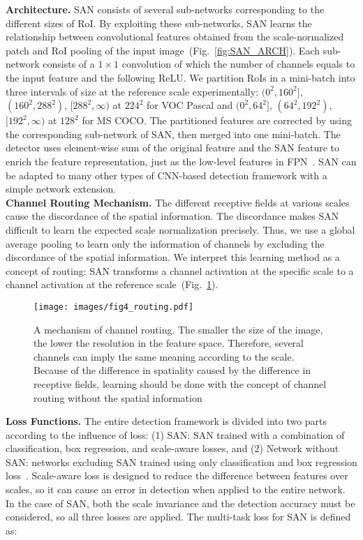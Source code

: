 \documentclass[runningheads]{llncs}
\begin{document}
\noindent
\textbf{Architecture.}
SAN consists of several sub-networks corresponding to the different sizes of RoI.
By exploiting these sub-networks, SAN learns the relationship between convolutional features obtained from the scale-normalized patch and RoI pooling of the input image~(Fig.~\ref{fig:SAN_ARCH}).
Each sub-network consists of a $1\times1$ convolution of which the number of channels equals to the input feature and the following ReLU. 
We partition RoIs in a mini-batch into three intervals of size at the reference scale experimentally: 
$(0^2,160^2]$, $(160^2,288^2)$, $[288^2,\infty)$ at $224^2$ for VOC Pascal 
and
$(0^2,64^2]$, $(64^2,192^2)$, $[192^2,\infty)$ at $128^2$ for MS COCO. 
The partitioned features are corrected by using the corresponding sub-network of SAN, then merged into one mini-batch.
The detector uses element-wise sum of the original feature and the SAN feature to enrich the feature representation, just as the low-level features in FPN~\cite{lin2017feature}.
SAN can be adapted to many other types of CNN-based detection framework with a simple network extension.
\\

\noindent
\textbf{Channel Routing Mechanism.} 
The different receptive fields at various scales cause the discordance of the spatial information.
The discordance makes SAN difficult to learn the expected scale normalization precisely. 
Thus, we use a global average pooling to learn only the information of channels by excluding the discordance of the spatial information.
We interpret this learning method as a concept of routing: SAN transforms a channel activation at the specific scale to a channel activation at the reference scale~(Fig.~\ref{fig:SAN_CHANNEL_ROUTING}).
\\



\begin{figure}[t]
	\texttt{[image: images/fig4\_routing.pdf]}
	\caption{A mechanism of channel routing.
		The smaller the size of the image, the lower the resolution in the feature space.
		Therefore, several channels can imply the same meaning according to the scale.
		Because of the difference in spatiality caused by the difference in receptive fields, learning should be done with the concept of channel routing without the spatial information}
	\centering
	\label{fig:SAN_CHANNEL_ROUTING}
\end{figure}



\noindent
\textbf{Loss Functions.} 
The entire detection framework is divided into two parts according to the influence of loss: 
(1) SAN: SAN trained with a combination of classification, box regression, and scale-aware losses,
and (2) Network without SAN: networks excluding SAN trained using only classification and box regression loss~\cite{girshick2015fast,ren2015faster,li2016r}.
Scale-aware loss is designed to reduce the difference between features over scales, so it can cause an error in detection when applied to the entire network.
In the case of SAN, both the scale invariance and the detection accuracy must be considered, so all three losses are applied. 
The multi-task loss for SAN is defined as:
\end{document}

